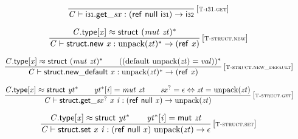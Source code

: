 $$
\begin{array}{@{}c@{}}\displaystyle
\frac{
}{
{\mathit{C}} \vdash {{\mathsf{i{\scriptstyle31}.get}}{\mathsf{\_}}}{{\mathit{sx}}} : (\mathsf{ref}~\mathsf{null}~\mathsf{i{\scriptstyle31}}) \rightarrow \mathsf{i{\scriptstyle32}}
} \, {[\textsc{\scriptsize T{-}i31.get}]}
\qquad
\end{array}
$$

\vspace{1ex}

$$
\begin{array}{@{}c@{}}\displaystyle
\frac{
{\mathit{C}}.\mathsf{type}{}[{\mathit{x}}] \approx \mathsf{struct}~{({\mathit{mut}}~{\mathit{zt}})^\ast}
}{
{\mathit{C}} \vdash \mathsf{struct.new}~{\mathit{x}} : {{\mathrm{unpack}}({\mathit{zt}})^\ast} \rightarrow (\mathsf{ref}~{\mathit{x}})
} \, {[\textsc{\scriptsize T{-}struct.new}]}
\qquad
\end{array}
$$

$$
\begin{array}{@{}c@{}}\displaystyle
\frac{
{\mathit{C}}.\mathsf{type}{}[{\mathit{x}}] \approx \mathsf{struct}~{({\mathit{mut}}~{\mathit{zt}})^\ast}
 \qquad
(({\mathrm{default}}~{\mathrm{unpack}}({\mathit{zt}}) = {\mathit{val}}))^\ast
}{
{\mathit{C}} \vdash \mathsf{struct.new\_default}~{\mathit{x}} : {{\mathrm{unpack}}({\mathit{zt}})^\ast} \rightarrow (\mathsf{ref}~{\mathit{x}})
} \, {[\textsc{\scriptsize T{-}struct.new\_default}]}
\qquad
\end{array}
$$

$$
\begin{array}{@{}c@{}}\displaystyle
\frac{
{\mathit{C}}.\mathsf{type}{}[{\mathit{x}}] \approx \mathsf{struct}~{{\mathit{yt}}^\ast}
 \qquad
{{\mathit{yt}}^\ast}{}[{\mathit{i}}] = {\mathit{mut}}~{\mathit{zt}}
 \qquad
{{\mathit{sx}}^?} = \epsilon \Leftrightarrow {\mathit{zt}} = {\mathrm{unpack}}({\mathit{zt}})
}{
{\mathit{C}} \vdash {{\mathsf{struct.get}}{\mathsf{\_}}}{{{\mathit{sx}}^?}}~{\mathit{x}}~{\mathit{i}} : (\mathsf{ref}~\mathsf{null}~{\mathit{x}}) \rightarrow {\mathrm{unpack}}({\mathit{zt}})
} \, {[\textsc{\scriptsize T{-}struct.get}]}
\qquad
\end{array}
$$

$$
\begin{array}{@{}c@{}}\displaystyle
\frac{
{\mathit{C}}.\mathsf{type}{}[{\mathit{x}}] \approx \mathsf{struct}~{{\mathit{yt}}^\ast}
 \qquad
{{\mathit{yt}}^\ast}{}[{\mathit{i}}] = \mathsf{mut}~{\mathit{zt}}
}{
{\mathit{C}} \vdash \mathsf{struct.set}~{\mathit{x}}~{\mathit{i}} : (\mathsf{ref}~\mathsf{null}~{\mathit{x}})~{\mathrm{unpack}}({\mathit{zt}}) \rightarrow \epsilon
} \, {[\textsc{\scriptsize T{-}struct.set}]}
\qquad
\end{array}
$$

